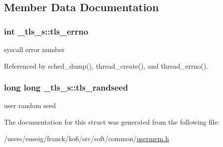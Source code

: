 \subsection{Member Data Documentation}
\hypertarget{struct__tls__s_a2b0505d872f110754ab80cdfe94bf58e}{
\subsubsection[{tls\-\_\-errno}]{\setlength{\rightskip}{0pt plus 5cm}int \-\_\-tls\-\_\-s\-::tls\-\_\-errno}}\label{struct__tls__s_a2b0505d872f110754ab80cdfe94bf58e}


syscall error number 



Referenced by sched\-\_\-dump(), thread\-\_\-create(), and thread\-\_\-errno().

\hypertarget{struct__tls__s_ae577aa68649d5ef9a8eec1ac1c4f3c88}{
\subsubsection[{tls\-\_\-randseed}]{\setlength{\rightskip}{0pt plus 5cm}long long \-\_\-tls\-\_\-s\-::tls\-\_\-randseed}}\label{struct__tls__s_ae577aa68649d5ef9a8eec1ac1c4f3c88}


user random seed 



The documentation for this struct was generated from the following file\-:\begin{DoxyCompactItemize}
\item 
/users/enseig/franck/ko6/src/soft/common/\hyperlink{usermem_8h}{usermem.\-h}\end{DoxyCompactItemize}
